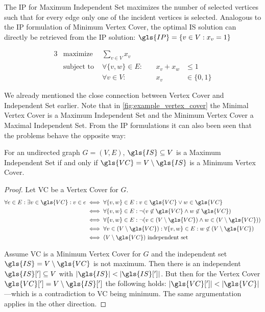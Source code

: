 The \gls{IP} for Maximum Independent Set maximizes the number of 
selected vertices such that for every edge only one of the incident 
vertices is selected. Analogous to the \gls{IP} formulation of Minimum
Vertex Cover, the optimal \gls{IS} solution can directly be retrieved 
from the \gls{IP} solution:
\( \gls{IP} = \{v \in V : x_v = 1\} \)

\begin{problem}
  \begin{alignat*}{3}
    &\text{maximize } & \sum\limits_{v \in V} x_v \\
    &\text{subject to } & \forall \{v,w\} \in E : &~& x_v + x_w &\leq 1 \\
    && \forall v \in V : &~& x_v &\in \{0,1\}
  \end{alignat*}
\end{problem}

We already mentioned the close connection between Vertex Cover and
Independent Set earlier. Note that in \cref{fig:example_vertex_cover}
the Minimal Vertex Cover is a Maximum Independent Set and the Minimum
Vertex Cover a Maximal Independent Set. From the \gls{IP} formulations
 it can also been seen that the problems behave the opposite way:

\begin{theorem}
  \label{thm:independent_set_vertex_cover}
  For an undirected graph \(G=(V,E)\), \(\gls{IS} \subseteq V\)
  is a Maximum Independent Set if and only if
  \(\gls{VC} = V \setminus \gls{IS}\)
  is a Minimum Vertex Cover.
  \begin{proof}
  Let \gls{VC} be a Vertex Cover for \(G\). 
  \begin{alignat*}{1}
    \forall e \in E : \exists v \in \gls{VC} : v \in e
    &\iff \forall \{v,w\} \in E :
      v \in \gls{VC} \lor w \in \gls{VC} \\
    &\iff \forall \{v, w\} \in E :
      \lnot(v \not\in \gls{VC} \land w \not\in \gls{VC}) \\
    &\iff \forall \{v, w\} \in E :
      \lnot(v \in (V \setminus \gls{VC})
        \land w \in (V \setminus \gls{VC})) \\
    &\iff \forall v \in (V \setminus \gls{VC}) :
      \forall \{v, w\} \in E :
      w \not\in (V \setminus \gls{VC}) \\
    &\iff (V \setminus \gls{VC}) \text{ independent set}
  \end{alignat*}
  
  Assume \gls{VC} is a Minimum Vertex Cover for \(G\) and the
  independent set \(\gls{IS} = V \setminus \gls{VC}\) is not maximum.
  Then there is an independent \(\gls{IS}['] \subseteq V\) with
  \(|\gls{IS}| < |\gls{IS}[']|\). But then for the Vertex Cover
  \(\gls{VC}['] = V \setminus \gls{IS}[']\) the following holds:
  \(|\gls{VC}[']| < |\gls{VC}|\)---which is a contradiction to
  \gls{VC} being minimum. The same argumentation applies in the other
  direction.
  \end{proof}
\end{theorem}

